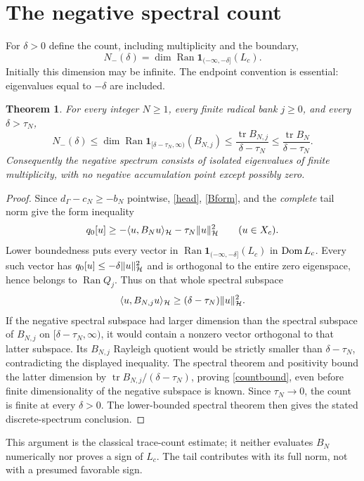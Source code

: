 \documentclass[11pt]{article}
\newtheorem{theorem}{Theorem}[section]\newtheorem{lemma}[theorem]{Lemma}\newtheorem{corollary}[theorem]{Corollary}
\begin{document}
\section{The negative spectral count}\label{count}
For $\delta>0$ define the count, including multiplicity and the boundary,
\begin{equation}\label{ndef}
 N_-(\delta)=\dim\operatorname{Ran}\mathbf1_{(-\infty,-\delta]}(L_c).
\end{equation}
Initially this dimension may be infinite. The endpoint convention is essential: eigenvalues equal to $-\delta$ are included.
\begin{theorem}\label{main}
For every integer $N\ge1$, every finite radical bank $j\ge0$, and every $\delta>\tau_N$,
\begin{equation}\label{countbound}
 N_-(\delta)\le\dim\operatorname{Ran}\mathbf1_{[\delta-\tau_N,\infty)}(B_{N,j})
 \le\frac{\operatorname{tr}B_{N,j}}{\delta-\tau_N}
 \le\frac{\operatorname{tr}B_N}{\delta-\tau_N}.
\end{equation}
Consequently the negative spectrum consists of isolated eigenvalues of finite multiplicity, with no negative accumulation point except possibly zero.
\end{theorem}
\begin{proof}
Since $d_\Gamma-c_N\ge-b_N$ pointwise, \eqref{head}, \eqref{Bform}, and the \emph{complete} tail norm give the form inequality
\begin{equation}\label{formfloor}
 q_0[u]\ge-\langle u,B_Nu\rangle_{\mathcal H}-\tau_N\lVert u\rVert_{\mathcal H}^2\qquad(u\in X_c).
\end{equation}
Lower boundedness puts every vector in $\operatorname{Ran}\mathbf1_{(-\infty,-\delta]}(L_c)$ in $\operatorname{Dom} L_c$. Every such vector has $q_0[u]\le-\delta\lVert u\rVert_{\mathcal H}^2$ and is orthogonal to the entire zero eigenspace, hence belongs to $\operatorname{Ran}Q_j$. Thus on that whole spectral subspace
\[\langle u,B_{N,j}u\rangle_{\mathcal H}\ge(\delta-\tau_N)\lVert u\rVert_{\mathcal H}^2.\]
If the negative spectral subspace had larger dimension than the spectral subspace of $B_{N,j}$ on $[\delta-\tau_N,\infty)$, it would contain a nonzero vector orthogonal to that latter subspace. Its $B_{N,j}$ Rayleigh quotient would be strictly smaller than $\delta-\tau_N$, contradicting the displayed inequality. The spectral theorem and positivity bound the latter dimension by $\operatorname{tr}B_{N,j}/(\delta-\tau_N)$, proving \eqref{countbound}, even before finite dimensionality of the negative subspace is known. Since $\tau_N\to0$, the count is finite at every $\delta>0$. The lower-bounded spectral theorem then gives the stated discrete-spectrum conclusion.
\end{proof}
This argument is the classical trace-count estimate; it neither evaluates $B_N$ numerically nor proves a sign of $L_c$. The tail contributes with its full norm, not with a presumed favorable sign.
\end{document}
